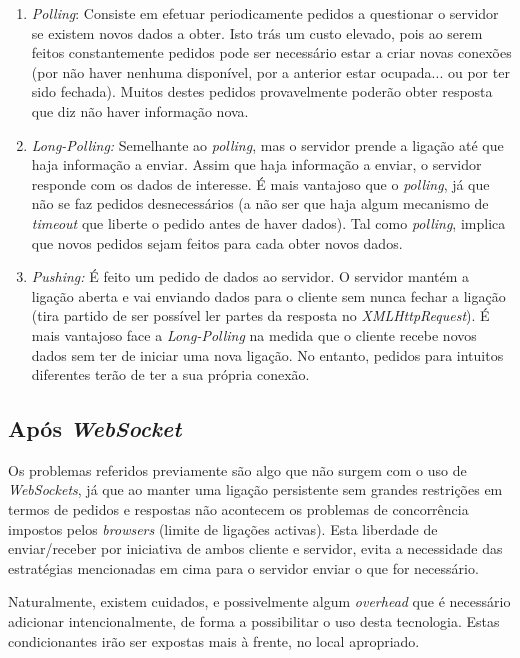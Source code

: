 \documentclass[a4paper]{article}
\begin{document}
\begin{enumerate}
	\item{\emph{Polling}:} Consiste em efetuar periodicamente pedidos a questionar o servidor se existem novos dados a obter. Isto trás um custo elevado, pois ao serem feitos constantemente pedidos pode ser necessário estar a criar novas conexões (por não haver nenhuma disponível, por a anterior estar ocupada... ou por ter sido fechada). Muitos destes pedidos provavelmente poderão obter resposta que diz não haver informação nova.

	\item{\emph{Long-Polling:}} Semelhante ao \emph{polling}, mas o servidor prende a ligação até que haja informação a enviar. Assim que haja informação a enviar, o servidor responde com os dados de interesse. É mais vantajoso que o \emph{polling}, já que não se faz pedidos desnecessários (a não ser que haja algum mecanismo de \emph{timeout} que liberte o pedido antes de haver dados). Tal como \emph{polling}, implica que novos pedidos sejam feitos para cada obter novos dados.
		
	\item{\emph{Pushing:}}  É feito um pedido de dados ao servidor. O servidor mantém a ligação aberta e vai enviando dados para o cliente sem nunca fechar a ligação (tira partido de ser possível ler partes da resposta no \emph{XMLHttpRequest}). É mais vantajoso face a \emph{Long-Polling} na medida que o cliente recebe novos dados sem ter de iniciar uma nova ligação. No entanto, pedidos para intuitos diferentes terão de ter a sua própria conexão.
\end{enumerate}

\subsection{Após \emph{WebSocket}}

Os problemas referidos previamente são algo que não surgem com o uso de \emph{WebSockets}, já que ao manter uma ligação persistente sem grandes restrições em termos de pedidos e respostas não acontecem os problemas de concorrência impostos pelos \emph{browsers} (limite de ligações activas). Esta liberdade de enviar/receber por iniciativa de ambos cliente e servidor, evita a necessidade das estratégias mencionadas em cima para o servidor enviar o que for necessário.

Naturalmente, existem cuidados, e possivelmente algum \emph{overhead} que é necessário adicionar intencionalmente, de forma a possibilitar o uso desta tecnologia. Estas condicionantes irão ser expostas mais à frente, no local apropriado.
\end{document}

